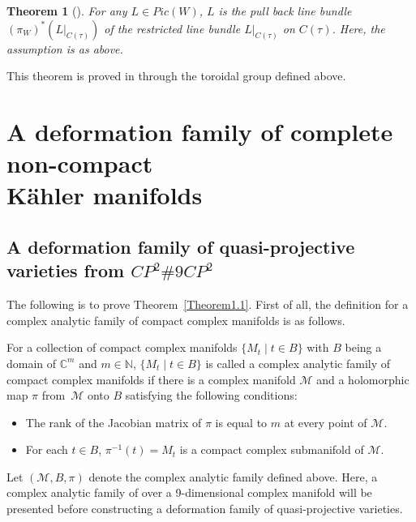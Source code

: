 \documentclass[10pt,a4paper]{amsart}
\numberwithin{equation}{section}
\newtheorem{Theorem}{Theorem}[section]
\def\boldsymbol#1{#1}
\def\operatorname#1{#1}
\def\overline#1{#1}
\begin{document}
\begin{Theorem}[{\cite[Proposition~3.3]{Takayuki-Takato2}}]\label{Theorem2.19}
 For any $L \in\operatorname{ Pic}(W)$, $L$ is the pull back line bundle~$(\pi_W)^*(L|_{C(\tau)})$ of the restricted line bundle $L|_{C(\tau)}$ on $C(\tau)$. Here, the assumption is as above.
\end{Theorem}

This theorem is proved in \cite{Takayuki-Takato2} through the toroidal group defined above.


\section[A deformation family of complete non-compact K\"ahler manifolds]{A deformation family of complete non-compact\\ K\"ahler manifolds}\label{sec3}

\subsection[A deformation family of quasi-projective varieties from CP\string^2 \#9CP\string^2]{A deformation family of quasi-projective varieties from $\boldsymbol{\operatorname{CP}^2 \#9 \overline{\operatorname{CP}}^2}$}\label{sec3.1}

The following is to prove Theorem~\ref{Theorem1.1}. First of all, the definition for a complex analytic family of compact complex manifolds is as follows.

\begin{Definition}\label{Definition3.1}
 For a collection of compact complex manifolds $ {\{M_t \mid t \!\in\! B\}}$ with $B$ being a domain of $\mathbb{C}^m$ and $m\in \mathbb{N} $, $ \{M_t \mid t \in B\}$ is called a complex analytic family of compact complex manifolds if there is a complex manifold $\mathcal{M}$ and a holomorphic map $\pi$ from~$\mathcal{M}$ onto $B$ satisfying the following conditions:
\begin{itemize}\itemsep=0pt
\item[$(1)$] The rank of the Jacobian matrix of $\pi$ is equal to $m$ at every point of $\mathcal{M}$.
\item[$(2)$] For each $t \in B$, $\pi^{-1}(t)=M_t$ is a compact complex submanifold of $\mathcal{M}$.
\end{itemize}
\end{Definition}

Let $(\mathcal{M},B,\pi)$ denote the complex analytic family defined above. Here, a complex analytic family of \smash{$\operatorname{CP}^2 \#9 \overline{\operatorname{CP}}^2$} over a 9-dimensional complex manifold will be presented before constructing a deformation family of quasi-projective varieties.
\end{document}
